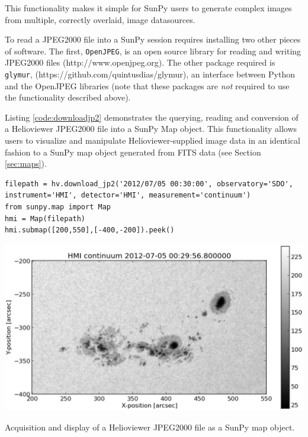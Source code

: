 This functionality makes it simple for SunPy users to generate complex
images from multiple, correctly overlaid, image datasources. 



To read a JPEG2000 file into a SunPy session requires installing two
other pieces of software. The first, \texttt{OpenJPEG}, is an open
source library for reading and writing JPEG2000 files
(http://www.openjpeg.org).  The other package required is
\texttt{glymur}, (https://github.com/quintusdias/glymur), an interface
between Python and the OpenJPEG libraries (note that these packages
are {\it not} required to use the functionality described above).


Listing \ref{code:downloadjp2} demonstrates the querying, reading and
conversion of a Helioviewer JPEG2000 file into a SunPy Map object.
This functionality allows users to visualize and manipulate
Helioviewer-supplied image data in an identical fashion to a SunPy map
object generated from FITS data (see Section \ref{sec:maps}).

\begin{listing}
\begin{verbatim}
filepath = hv.download_jp2('2012/07/05 00:30:00', observatory='SDO', instrument='HMI', detector='HMI', measurement='continuum')
from sunpy.map import Map
hmi = Map(filepath)
hmi.submap([200,550],[-400,-200]).peek()
\end{verbatim}
\includegraphics[width=0.8\columnwidth]{helioviewer_hmi_continuum_jp2_to_map.eps}
\caption{Acquisition and display of a Helioviewer JPEG2000 file as a
  SunPy map object.}
\label{code:downloadjp2}
\end{listing}

%
%
